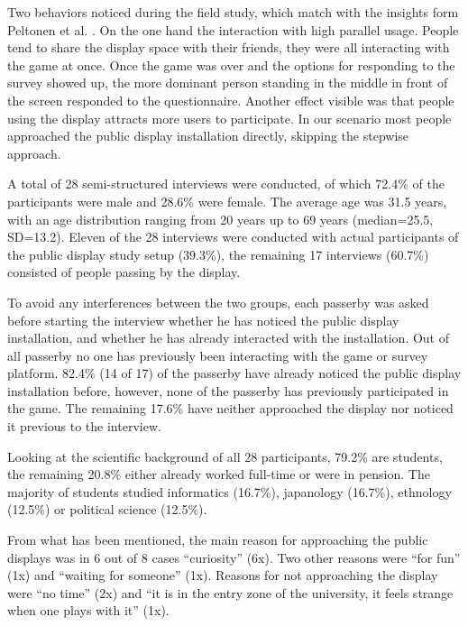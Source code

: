 
Two behaviors noticed during the field study, which match with the insights form Peltonen et al. \cite{peltonen2008s}. On the one hand the interaction with high parallel usage. People tend to share the display space with their friends, they were all interacting with the game at once. Once the game was over and the options for responding to the survey showed up, the more dominant person standing in the middle in front of the screen responded to the questionnaire. Another effect visible was that people using the display attracts more users to participate.
In our scenario most people approached the public display installation directly, skipping the stepwise approach.



A total of 28 semi-structured interviews were conducted, of which 72.4\% of the participants were male and 28.6\% were female. The average age was 31.5 years, with an age distribution ranging from 20 years up to 69 years (median=25.5, SD=13.2). Eleven of the 28 interviews were conducted with actual participants of the public display study setup (39.3\%), the remaining 17 interviews (60.7\%) consisted of people passing by the display. 

To avoid any interferences between the two groups, each passerby was asked before starting the interview whether he has noticed the public display installation, and whether he has already interacted with the installation. Out of all passerby no one has previously been interacting with the game or survey platform. 82.4\% (14 of 17) of the passerby have already noticed the public display installation before, however, none of the passerby has previously participated in the game. The remaining 17.6\% have neither approached the display nor noticed it previous to the interview. 

Looking at the scientific background of all 28 participants, 79.2\% are students, the remaining 20.8\% either already worked full-time or were in pension. The majority of students studied informatics (16.7\%), japanology (16.7\%), ethnology (12.5\%) or political science (12.5\%).

From what has been mentioned, the main reason for approaching the public displays was in 6 out of 8 cases ``curiosity'' (6x). Two other reasons were ``for fun'' (1x) and ``waiting for someone'' (1x). Reasons for not approaching the display were ``no time'' (2x) and ``it is in the entry zone of the university, it feels strange when one plays with it'' (1x).

